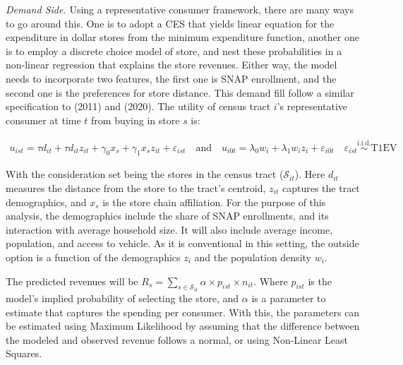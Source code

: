 \documentclass[11pt]{article}
\begin{document}

\textit{Demand Side.}  Using a representative consumer framework, there are many ways to go around this. One is to adopt a CES that yields linear equation for the expenditure in dollar stores from the minimum expenditure function, another one is to employ a discrete choice model of store, and nest these probabilities in a non-linear regression that explains the store revenues. Either way, the model needs to incorporate two features, the first one is SNAP enrollment, and the second one is the preferences for store distance. This demand fill follow a similar specification to \citeauthor{holmes2011diffusion} (2011) and \citeauthor{ellickson2020measuring} (2020). The utility of census tract $i$'s representative consumer at time $t$  from buying in store $s$ is:

\vspace{-10mm}


\begin{align}
    u_{ist} =\tau d_{it} + \tau d_{it} z_{it} + \gamma_0 x_s + \gamma_1 x_s  z_{it} + \varepsilon_{ist}  \quad \text{and} \quad  u_{i0t} = \lambda_0 w_i + \lambda_1 w_i z_i  + \varepsilon_{i0t} \quad \varepsilon_{ist} \overset{\text{i.i.d.}}{\sim} \text{T1EV}
\end{align}

With the consideration set being the stores in the census tract ($\mathcal{S}_{it}$). Here $d_{it}$ measures the distance from the store to the tract's centroid, $z_{it}$ captures the tract demographics, and $x_s$ is the store chain affiliation. For the purpose of this analysis, the demographics include the share of SNAP enrollments, and its interaction with average household size. It will also include average income, population, and access to vehicle. As it is conventional in this setting, the outside option is a function of the demographics $z_i$ and the population density $w_i$.  

The predicted revenues will be $R_s = \sum_{s \in \mathcal{S}_{it}} \alpha \times p_{ist} \times n_{it}$. Where $p_{ist}$ is the model's implied probability of selecting the store, and $\alpha$ is a parameter to estimate that captures the spending per consumer. With this, the parameters can be estimated using Maximum Likelihood by assuming that the difference between the modeled and observed revenue follows a normal, or using Non-Linear Least Squares. 
\end{document}
